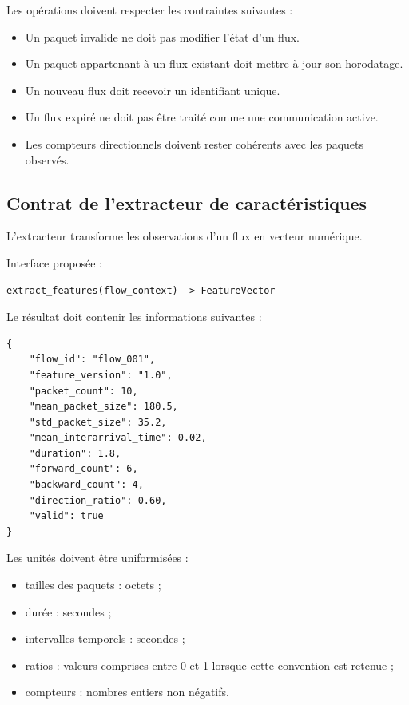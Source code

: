 Les opérations doivent respecter les contraintes suivantes :

\begin{itemize}
    \item Un paquet invalide ne doit pas modifier l'état d'un flux.
    \item Un paquet appartenant à un flux existant doit mettre à jour son horodatage.
    \item Un nouveau flux doit recevoir un identifiant unique.
    \item Un flux expiré ne doit pas être traité comme une communication active.
    \item Les compteurs directionnels doivent rester cohérents avec les paquets observés.
\end{itemize}

\subsection{Contrat de l'extracteur de caractéristiques}

L'extracteur transforme les observations d'un flux en vecteur numérique.

Interface proposée :

\begin{verbatim}
extract_features(flow_context) -> FeatureVector
\end{verbatim}

Le résultat doit contenir les informations suivantes :

\begin{verbatim}
{
    "flow_id": "flow_001",
    "feature_version": "1.0",
    "packet_count": 10,
    "mean_packet_size": 180.5,
    "std_packet_size": 35.2,
    "mean_interarrival_time": 0.02,
    "duration": 1.8,
    "forward_count": 6,
    "backward_count": 4,
    "direction_ratio": 0.60,
    "valid": true
}
\end{verbatim}

Les unités doivent être uniformisées :

\begin{itemize}
    \item tailles des paquets : octets ;
    \item durée : secondes ;
    \item intervalles temporels : secondes ;
    \item ratios : valeurs comprises entre 0 et 1 lorsque cette convention est retenue ;
    \item compteurs : nombres entiers non négatifs.
\end{itemize}

